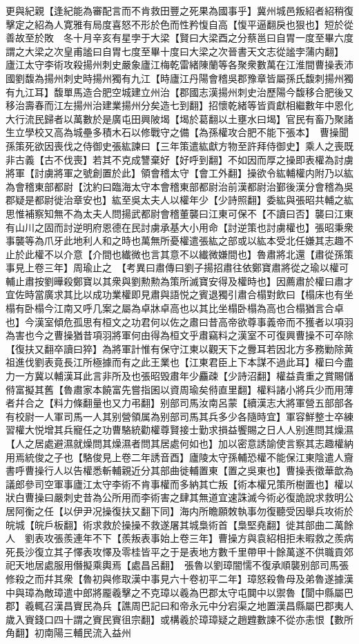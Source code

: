 更與紀親【逢紀能為審配言而不肯救田豐之死果為國事乎】冀州城邑叛紹者紹稍復擊定之紹為人寛雅有局度喜怒不形於色而性矜愎自高【愎平逼翻戾也狠也】短於從善故至於敗　冬十月辛亥有星孛于大梁【賢曰大梁酉之分蔡邕曰自胃一度至畢六度謂之大梁之次皇甫謐曰自胃七度至畢十度曰大梁之次晉書天文志從謐孛蒲内翻】　廬江太守李術攻殺揚州刺史嚴象廬江梅乾雷緒陳蘭等各聚衆數萬在江淮間曹操表沛國劉馥為揚州刺史時揚州獨有九江【時廬江丹陽會稽吳郡豫章皆屬孫氏馥刺揚州獨有九江耳】馥單馬造合肥空城建立州治【郡國志漢揚州刺史治歷陽今馥移合肥後又移治壽春而江左揚州治建業揚州分矣造七到翻】招懷乾緒等皆貢獻相繼數年中恩化大行流民歸者以萬數於是廣屯田興陂堨【堨於葛翻以土壅水曰堨】官民有畜乃聚諸生立學校又高為城壘多積木石以修戰守之備【為孫權攻合肥不能下張本】　曹操聞孫策死欲因喪伐之侍御史張紘諫曰【三年策遣紘獻方物至許拜侍御史】乘人之喪既非古義【古不伐喪】若其不克成讐棄好【好呼到翻】不如因而厚之操即表權為討虜將軍【討虜將軍之號創置於此】領會稽太守【會工外翻】操欲令紘輔權内附乃以紘為會稽東部都尉【沈約曰臨海太守本會稽東部都尉治前漢都尉治鄞後漢分會稽為吳郡疑是都尉徙治章安也】紘至吳太夫人以權年少【少詩照翻】委紘與張昭共輔之紘思惟補察知無不為太夫人問揚武都尉會稽董襲曰江東可保不【不讀曰否】襲曰江東有山川之固而討逆明府恩德在民討虜承基大小用命【討逆策也討虜權也】張昭秉衆事襲等為爪牙此地利人和之時也萬無所憂權遣張紘之部或以紘本受北任嫌其志趣不止於此權不以介意【介間也纎微也言其意不以纎微嫌間也】魯肅將北還【肅從孫策事見上卷三年】周瑜止之　【考異曰肅傳曰劉子揚招肅往依鄭寶肅將從之瑜以權可輔止肅按劉曄殺鄭寶以其衆與劉勲勲為策所滅寶安得及權時也】因薦肅於權曰肅才宜佐時當廣求其比以成功業權即見肅與語悦之賓退獨引肅合榻對飲曰【榻床也有坐榻有卧榻今江南又呼几案之屬為卓牀卓高也以其比坐榻卧榻為高也合榻猶言合卓也】今漢室傾危孤思有桓文之功君何以佐之肅曰昔高帝欲尊事義帝而不獲者以項羽為害也今之曹操猶昔項羽將軍何由得為桓文乎肅竊料之漢室不可復興曹操不可卒除【復扶又翻卒讀曰猝】為將軍計惟有保守江東以觀天下之釁耳若因北方多務勦除黄祖進伐劉表竟長江所極據而有之此王業也【江東君臣上下本謀不過此耳】權曰今盡力一方冀以輔漢耳此言非所及也張昭毁肅年少麤疎【少詩沼翻】權益貴重之賞賜儲偫富擬其舊【魯肅家本饒富先嘗指囷以資周瑜矣偫直里翻】權料諸小將兵少而用薄者幷合之【料力條翻量也又力弔翻】别部司馬汝南呂蒙【續漢志大將軍營五部部各有校尉一人軍司馬一人其别營領属為别部司馬其兵多少各隨時宜】軍容鮮整士卒練習權大悦增其兵寵任之功曹駱統勸權尊賢接士勤求損益饗賜之日人人别進問其燥濕【人之居處避濕就燥問其燥濕者問其居處何如也】加以密意誘諭使言察其志趣權納用焉統俊之子也【駱俊見上卷二年誘音酉】廬陵太守孫輔恐權不能保江東陰遣人齎書呼曹操行人以告權悉斬輔親近分其部曲徙輔置東【置之吳東也】曹操表徵華歆為議郎參司空軍事廬江太守李術不肯事權而多納其亡叛【術本權兄策所樹置也】權以狀白曹操曰嚴刺史昔為公所用而李術害之肆其無道宜速誅滅今術必復詭說求救明公居阿衡之任【以伊尹况操復扶又翻下同】海内所瞻願敇執事勿復聽受因舉兵攻術於皖城【皖戶板翻】術求救於操操不救遂屠其城梟術首【梟堅堯翻】徙其部曲二萬餘人　劉表攻張羨連年不下【羨叛表事始上卷三年】曹操方與袁紹相拒未暇救之羨病死長沙復立其子懌表攻懌及零桂皆平之于是表地方數千里帶甲十餘萬遂不供職貢郊祀天地居處服用僭擬乘輿焉【處昌呂翻】　張魯以劉璋闇懦不復承順襲别部司馬張修殺之而幷其衆【魯初與修取漢中事見六十卷初平二年】璋怒殺魯母及弟魯遂據漢中與璋為敵璋遣中郎將龎羲擊之不克璋以羲為巴郡太守屯䦘中以禦魯【閬中縣屬巴郡】羲輒召漢昌賨民為兵【譙周巴記曰和帝永元中分宕渠之地置漢昌縣屬巴郡夷人歲入賨錢口四十謂之賨民賨徂宗翻】或構羲於璋璋疑之趙韙數諫不從亦恚恨【數所角翻】初南陽三輔民流入益州